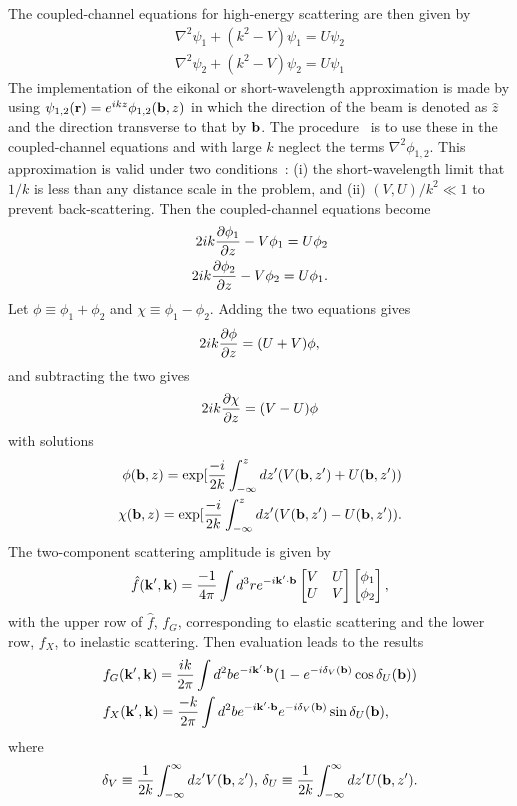 \documentclass[prl,twocolumn,longbibliography,letterpaper,showpacs,groupedaddress,superscriptaddress,nofootinbib,floatfix,preprintnumbers,tightenlines]{revtex4-1}
\newcommand{\bea}{\begin{eqnarray}}
\newcommand{\eea}{\end{eqnarray}}
\def\bfr{{\bf r}}\def\bfb{{\bf b}}\def\bfk {{\bf k}}
\begin{document}
The coupled-channel equations for high-energy scattering are then given by
\bea
\nabla^2\psi_1 +(k^2-V)\psi_1=U\psi_2\\
\nabla^2\psi_2 +(k^2-V)\psi_2=U\psi_1
%
\eea
The implementation of the eikonal or short-wavelength approximation is made by using $\psi_{1,2}(\bfr)=e^{i kz}\phi_{1,2}(\bfb,z)$ in which the direction of the beam is denoted as $\hat z$ and the direction transverse to that by $\bfb$. The procedure~\cite{Glauber}  is to use these in the coupled-channel equations and with large $k$ neglect the terms  $\nabla^2\phi_{1,2}$. This approximation is valid under two conditions~\cite{Glauber}: (i)  the short-wavelength limit that $1/k$ is less than any distance scale in the problem, and (ii) $(V,U)/k^2\ll1$ to prevent back-scattering. Then the coupled-channel equations become
\bea
2i k {\partial \phi_1 \over \partial z}-V\phi_1=U\phi_2\\
2i k {\partial \phi_2 \over \partial z}-V\phi_2=U\phi_1.
\eea
Let $\phi\equiv \phi_1+\phi_2$ and $\chi
\equiv \phi_1-\phi_2$. Adding the two equations gives
\bea 2i k {\partial \phi \over \partial z}=(U+V)\phi,\eea
and subtracting the two gives
\bea 2i k {\partial \chi \over \partial z}=(V-U)\phi\eea
with solutions
\bea\phi(\bfb,z)=\exp[{{-i\over 2k}\int_{-\infty}^z dz'(V(\bfb,z')+U(\bfb,z'))}\\
\chi(\bfb,z)=\exp[{{-i\over 2k}\int_{-\infty}^z dz' (V(\bfb,z')-U(\bfb,z'))}.
\eea
The two-component scattering amplitude is given by
\bea
\hat f(\bfk',\bfk)={-1\over 4\pi}\int d^3re^{-i\bfk'\cdot \bfb}\begin{bmatrix}
V&U\\
U&V
\end{bmatrix}\begin{bmatrix}\phi_1\\ \phi_2\end{bmatrix},
\eea
with the upper row of $\hat f$, $f_G$, corresponding to elastic scattering and the lower row, $f_X$, to inelastic scattering.
Then evaluation leads to the results
\bea%
&
%
f_G(\bfk',\bfk)={i k\over 2\pi}\int d^2b e^{-i\bfk'\cdot\bfb}(1-e^{-i\d_V(\bfb)}\cos\d_U(\bfb))\label{fG}\\&%
f_X(\bfk',\bfk)={-k\over 2\pi}\int d^2b e^{-i\bfk'\cdot\bfb}e^{-i\d_V(\bfb)}\sin\d_U(\bfb),
\eea
where
\bea \d_V\equiv {1\over 2k}\int_{-\infty}^\infty dz'V(\bfb,z'),\,\d_U\equiv {1\over 2k}\int_{-\infty}^\infty dz'U(\bfb,z').\label{delta}\eea
\end{document}
